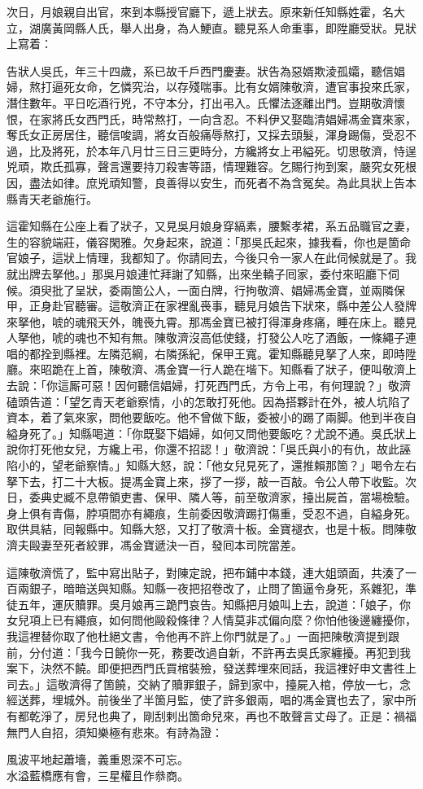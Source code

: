 次日，月娘親自出官，來到本縣授官廳下，遞上狀去。原來新任知縣姓霍，名大立，湖廣黃岡縣人氏，舉人出身，為人鯁直。聽見系人命重事，即陞廳受狀。見狀上寫着：

\begin{myquote}[\markfont]
告狀人吳氏，年三十四歲，系已故千戶西門慶妻。狀告為惡婿欺淩孤孀，聽信娼婦，熬打逼死女命，乞憐究治，以存殘喘事。比有女婿陳敬濟，遭官事投來氏家，潛住數年。平日吃酒行兇，不守本分，打出弔入。氏懼法逐離出門。豈期敬濟懷恨，在家將氏女西門氏，時常熬打，一向含忍。不料伊又娶臨清娼婦馮金寶來家，奪氏女正房居住，聽信唆調，將女百般痛辱熬打，又採去頭髮，渾身踢傷，受忍不過，比及將死，於本年八月廿三日三更時分，方纔將女上弔縊死。切思敬濟，恃逞兇頑，欺氏孤寡，聲言還要持刀殺害等語，情理難容。{}乞賜行拘到案，嚴究女死根因，盡法如律。庶兇頑知警，良善得以安生，而死者不為含冤矣。為此具狀上告本縣青天老爺施行。
\end{myquote}

這霍知縣在公座上看了狀子，又見吳月娘身穿縞素，腰繫孝裙，系五品職官之妻，生的容貌端莊，儀容閑雅。欠身起來，說道：「那吳氏起來，據我看，你也是箇命官娘子，這狀上情理，我都知了。你請囘去，今後只令一家人在此伺候就是了。我就出牌去拏他。」那吳月娘連忙拜謝了知縣，出來坐轎子囘家，委付來昭廳下伺候。須臾批了呈狀，委兩箇公人，一面白牌，行拘敬濟、娼婦馮金寶，並兩隣保甲，正身赴官聽審。這敬濟正在家裡亂䘮事，聽見月娘告下狀來，縣中差公人發牌來拏他，唬的魂飛天外，魄䘮九霄。那馮金寶已被打得渾身疼痛，睡在床上。聽見人拏他，唬的魂也不知有無。陳敬濟沒高低使錢，打發公人吃了酒飯，一條繩子連唱的都拴到縣裡。左隣范綱，右隣孫紀，保甲王寬。霍知縣聽見拏了人來，即時陞廳。來昭跪在上首，陳敬濟、馮金寶一行人跪在堦下。知縣看了狀子，便叫敬濟上去說：「你這厮可惡！因何聽信娼婦，打死西門氏，方令上弔，有何理說？」敬濟磕頭告道：「望乞青天老爺察情，小的怎敢打死他。因為搭夥計在外，被人坑陷了資本，着了氣來家，問他要飯吃。他不曾做下飯，委被小的踢了兩脚。他到半夜自縊身死了。」知縣喝道：「你既娶下娼婦，如何又問他要飯吃？尤說不通。吳氏狀上說你打死他女兒，方纔上弔，你還不招認！」敬濟說：「吳氏與小的有仇，故此誣陷小的，望老爺察情。」知縣大怒，說：「他女兒見死了，還推賴那箇？」喝令左右拏下去，打二十大板。提馮金寶上來，拶了一拶，敲一百敲。令公人帶下收監。次日，委典史臧不息帶領吏書、保甲、隣人等，前至敬濟家，擡出屍首，當場檢驗。身上俱有青傷，脖項間亦有繩痕，生前委因敬濟踢打傷重，受忍不過，自縊身死。{}取供具結，囘報縣中。知縣大怒，又打了敬濟十板。金寶褪衣，也是十板。問陳敬濟夫毆妻至死者絞罪，馮金寶遞決一百，發囘本司院當差。

這陳敬濟慌了，監中寫出貼子，對陳定說，把布鋪中本錢，連大姐頭面，共湊了一百兩銀子，暗暗送與知縣。知縣一夜把招卷改了，{}止問了箇逼令身死，系雜犯，準徒五年，運灰贖罪。吳月娘再三跪門哀告。知縣把月娘叫上去，說道：「娘子，你女兒項上已有繩痕，如何問他毆殺條律？人情莫非忒偏向麼？你怕他後邊纏擾你，我這裡替你取了他杜絕文書，令他再不許上你門就是了。」{}一面把陳敬濟提到跟前，分付道：「我今日饒你一死，務要改過自新，不許再去吳氏家纏擾。再犯到我案下，決然不饒。即便把西門氏買棺裝殮，發送葬埋來囘話，我這裡好申文書徃上司去。」這敬濟得了箇饒，交納了贖罪銀子，歸到家中，擡屍入棺，停放一七，念經送葬，埋城外。前後坐了半箇月監，使了許多銀兩，唱的馮金寶也去了，家中所有都乾淨了，房兒也典了，剛刮剌出箇命兒來，再也不敢聲言丈母了。正是：禍福無門人自招，須知樂極有悲來。有詩為證：

\begin{myquote}
風波平地起蕭墻，義重恩深不可忘。\\水溢藍橋應有會，三星權且作叅商。
\end{myquote}
